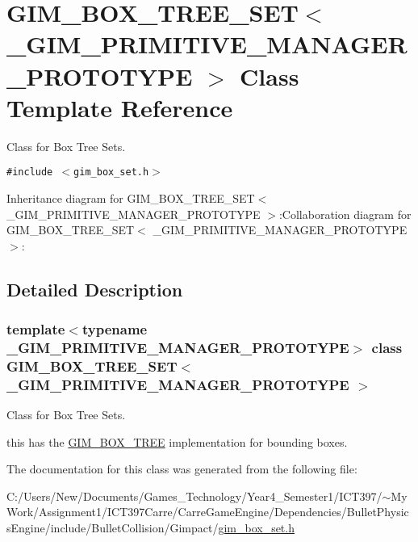 \hypertarget{class_g_i_m___b_o_x___t_r_e_e___s_e_t}{
\section{GIM\_\-BOX\_\-TREE\_\-SET$<$ \_\-GIM\_\-PRIMITIVE\_\-MANAGER\_\-PROTOTYPE $>$ Class Template Reference}
\label{class_g_i_m___b_o_x___t_r_e_e___s_e_t}
}
Class for Box Tree Sets.  


{\tt \#include $<$gim\_\-box\_\-set.h$>$}

Inheritance diagram for GIM\_\-BOX\_\-TREE\_\-SET$<$ \_\-GIM\_\-PRIMITIVE\_\-MANAGER\_\-PROTOTYPE $>$:Collaboration diagram for GIM\_\-BOX\_\-TREE\_\-SET$<$ \_\-GIM\_\-PRIMITIVE\_\-MANAGER\_\-PROTOTYPE $>$:

\subsection{Detailed Description}
\subsubsection*{template$<$typename \_\-GIM\_\-PRIMITIVE\_\-MANAGER\_\-PROTOTYPE$>$ class GIM\_\-BOX\_\-TREE\_\-SET$<$ \_\-GIM\_\-PRIMITIVE\_\-MANAGER\_\-PROTOTYPE $>$}

Class for Box Tree Sets. 

this has the \hyperlink{class_g_i_m___b_o_x___t_r_e_e}{GIM\_\-BOX\_\-TREE} implementation for bounding boxes. 

The documentation for this class was generated from the following file:\begin{CompactItemize}
\item 
C:/Users/New/Documents/Games\_\-Technology/Year4\_\-Semester1/ICT397/$\sim$My Work/Assignment1/ICT397Carre/CarreGameEngine/Dependencies/BulletPhysicsEngine/include/BulletCollision/Gimpact/\hyperlink{gim__box__set_8h}{gim\_\-box\_\-set.h}\end{CompactItemize}
